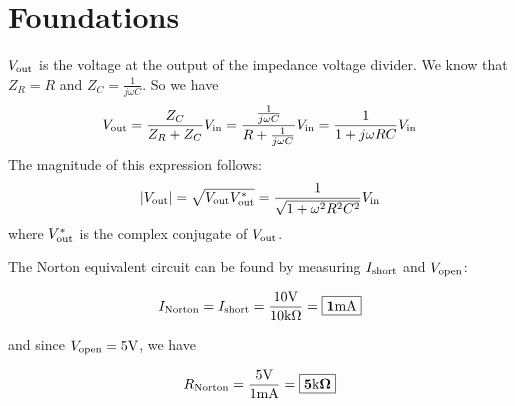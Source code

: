 \documentclass[../main.tex]{subfiles}
\begin{document}
\section{Foundations}


    $V_{\text{out}}$ is the voltage at the output of the impedance voltage divider. We know that $Z_R = R$ and $Z_C = \frac{1}{j\omega C}$. So we have 
    \[V_{\text{out}} = \frac{Z_C}{Z_R + Z_C} V_{\text{in}} = \frac{\frac{1}{j \omega C}}{R + \frac{1}{j \omega C}} V_{\text{in}} = \frac{1}{1 + j \omega R C} V_{\text{in}}\]
    The magnitude of this expression follows:
    \[|V_{\text{out}}| = \sqrt{V_{\text{out}} V_{\text{out}}^*} = \frac{1}{\sqrt{1 + \omega^2R^2C^2}}V_{\text{in}}\]
    where $V_{\text{out}}^*$ is the complex conjugate of $V_{\text{out}}$.
    

    The Norton equivalent circuit can be found by measuring $I_{\text{short}}$ and $V_{\text{open}}$:
    
    \[I_{\text{Norton}} = I_{\text{short}} = \frac{10\text{V}}{10\text{k}\Omega} = \boxed{\mathbf{1\text{m}\text{A}}}\] 
    
    and since $V_{\text{open}} = 5\text{V}$, we have
    
    \[R_{\text{Norton}} = \frac{5\text{V}}{1\text{m}\text{A}} = \boxed{\mathbf{5\text{k}\Omega}}\]
\end{document}
